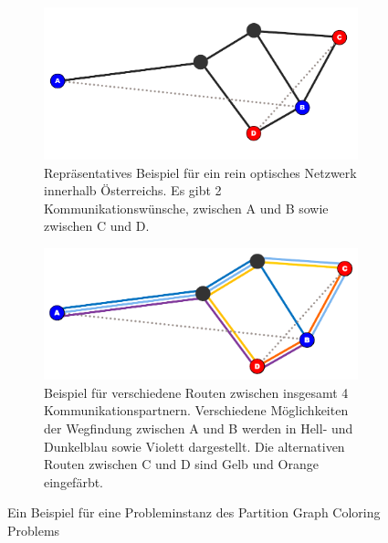 \begin{figure}
	\centering
	\begin{subfigure}{\textwidth}
		\includegraphics{img/bsp1}
		\caption{Repräsentatives Beispiel für ein rein optisches Netzwerk innerhalb 
		Österreichs. Es gibt 2 Kommunikationswünsche, zwischen A und B sowie zwischen C und D.}
		\label{fig:example:a}
	\end{subfigure}
	\begin{subfigure}{\textwidth}
		\includegraphics{img/bsp2}
		\caption{Beispiel für verschiedene Routen zwischen insgesamt 4 Kommunikationspartnern.
		Verschiedene Möglichkeiten der Wegfindung zwischen A und B werden in Hell- und Dunkelblau sowie Violett dargestellt. Die alternativen Routen zwischen C und D sind
		Gelb und Orange eingefärbt.}
		\label{fig:example:b}
	\end{subfigure}
	\caption{Ein Beispiel für eine Probleminstanz des Partition Graph Coloring Problems}
	\label{fix:example}
\end{figure}

